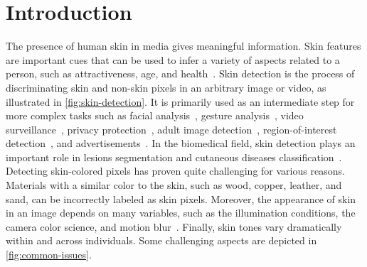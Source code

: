 \chapter{Introduction}\label{chap:introduction}


\noindent The presence of human skin in media gives meaningful information. 
Skin features are important cues that can be used to infer a variety of aspects related to a person, such as attractiveness, age, and health~\cite{fink2006visible, choi2011age}.
Skin detection is the process of discriminating skin and non-skin pixels in an arbitrary image or video, as illustrated in \autoref{fig:skin-detection}. It is primarily used as an intermediate step for more complex tasks such as facial analysis~\cite{ramirez2014color, baskan2002projection}, gesture analysis~\cite{singha2018dynamic}, video surveillance~\cite{chen2012statistical}, privacy protection~\cite{shifa2020skin}, adult image detection~\cite{jones2002statistical, stottinger2009skin, zhu2004adaptive}, region-of-interest detection~\cite{liu2008region}, and advertisements~\cite{low2020multi}.
In the biomedical field, skin detection plays an important role in lesions segmentation and cutaneous diseases classification~\cite{do2014early, ronneberger2015u}.
Detecting skin-colored pixels has proven quite challenging for various reasons.
Materials with a similar color to the skin, such as wood, copper, leather, and sand, can be incorrectly labeled as skin pixels.
Moreover, the appearance of skin in an image depends on many variables, such as the illumination conditions, the camera color science, and motion blur~\cite{zarit1999comparison}.
Finally, skin tones vary dramatically within and across individuals.
Some challenging aspects are depicted in \autoref{fig:common-issues}.

